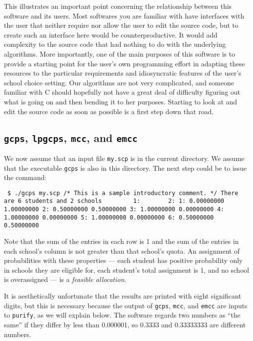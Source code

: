 \documentclass[12pt]{article}
\theoremstyle{definition}
\begin{document}
This illustrates an important point concerning the relationship
between this software and its users.  Most softwares you are familiar
with have interfaces with the user that neither require nor allow the
user to edit the source code, but to create such an interface here
would be counterproductive. It would add complexity to the source code
that had nothing to do with the underlying algorithms.  More
importantly, one of the main purposes of this software is to provide a
starting point for the user's own programming effort in adapting these
resources to the particular requirements and idiosyncratic features of
the user's school choice setting.  Our algorithms are not very
complicated, and someone familiar with C should hopefully not have a
great deal of difficulty figuring out what is going on and then
bending it to her purposes.  Starting to look at and edit the source
code as soon as possible is a first step down that road.

\subsection{\texttt{gcps}, \texttt{lpgcps}, \texttt{mcc}, and \texttt{emcc}}

We now assume that  an input file \texttt{my.scp} is
in the current directory.  We assume that the executable \texttt{gcps}
is also in this directory.  The next step could be to issue the
command:
\begin{obeylines}
  \texttt{
    \$ ./gcps my.scp 
/* This is a sample introductory comment. */
There are 6 students and 2 schools
\ \ \ \ \ \ \ \   1: \ \ \ \ \ \ \  2:
1:   0.00000000  1.00000000
2:   0.50000000  0.50000000
3:   1.00000000  0.00000000
4:   1.00000000  0.00000000
5:   1.00000000  0.00000000
6:   0.50000000  0.50000000
}
\end{obeylines} \noindent

\smallskip \noindent Note that the sum of the entries in each row is 1
and the sum of the entries in each school's column is not greater than
that school's quota.  An assignment of probabilities with these
properties --- each student has positive probability only in schools
they are eligible for, each student's total assignment is 1, and no
school is overassigned --- is a \emph{feasible allocation}.

It is aesthetically unfortunate that the results are printed with
eight significant digits, but this is necessary because the output of
\texttt{gcps}, \texttt{mcc}, and \texttt{emcc} are inputs to
\texttt{purify}, as we will explain below.  The software regards two
numbers as ``the same'' if they differ by less than 0.000001, so
0.3333 and 0.33333333 are different numbers.
\end{document}

